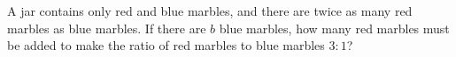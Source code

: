 A jar contains only red and blue marbles, and there are twice as many red marbles as blue marbles. If there are $b$ blue marbles, how many red marbles must be added to make the ratio of red marbles to blue marbles $3:1$?
